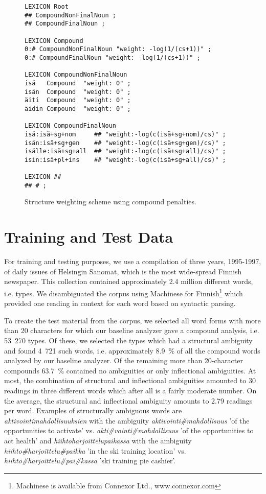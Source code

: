 \documentclass[11pt]{article}
\begin{document}
\begin{figure*}[htb!]
  \begin{small}
\begin{verbatim}
LEXICON Root
## CompoundNonFinalNoun ;
## CompoundFinalNoun ;

LEXICON Compound
0:# CompoundNonFinalNoun "weight: -log(1/(cs+1))" ;
0:# CompoundFinalNoun "weight: -log(1/(cs+1))" ;

LEXICON CompoundNonFinalNoun
isä   Compound  "weight: 0" ;
isän  Compound  "weight: 0" ;
äiti  Compound  "weight: 0" ;
äidin Compound  "weight: 0" ;

LEXICON CompoundFinalNoun
isä:isä+sg+nom     ## "weight:-log(c(isä+sg+nom)/cs)" ;
isän:isä+sg+gen    ## "weight:-log(c(isä+sg+gen)/cs)" ;
isälle:isä+sg+all  ## "weight:-log(c(isä+sg+all)/cs)" ;
isin:isä+pl+ins    ## "weight:-log(c(isä+sg+all)/cs)" ;

LEXICON ##
## # ;
\end{verbatim}
    \caption{Structure weighting scheme using compound penalties.
    }\label{fig:weighted3}
  \end{small}
\end{figure*}


\section{Training and Test Data}
\label{Sect4}

For training and testing purposes, we use a compilation of three
years, 1995-1997, of daily issues of Helsingin Sanomat, which is the
most wide-spread Finnish newspaper. This collection contained
approximately 2.4 million different words, i.e. types. We
disambiguated the corpus using Machinese for
Finnish\footnote{Machinese is available from Connexor Ltd.,
  www.connexor.com} which provided one reading in context for each
word based on syntactic parsing.

To create the test material from the corpus, we selected all word
forms with more than 20 characters for which our baseline analyzer
\cite{pirinen/2008} gave a compound analysis, i.e. 53~270 types. Of
these, we selected the types which had a structural ambiguity and
found 4~721 such words, i.e. approximately 8.9~\% of all the compound
words analyzed by our baseline analyzer. Of the remaining more than
20-character compounds 63.7~\% contained no ambiguities or only
inflectional ambiguities. At most, the combination of structural and
inflectional ambiguities amounted to 30 readings in three different
words which after all is a fairly moderate number. On the average, the
structural and inflectional ambiguity amounts to 2.79 readings per
word. Examples of structurally ambiguous words are
\emph{aktivointi\-mahdollisuuksien} with the ambiguity
\emph{aktivointi\#mahdollisuus} 'of the opportunities to activate' vs.
\emph{akti\#vointi\#mahdollisuus} 'of the opportunities to act health'
and \emph{hiihto\-harjoittelu\-paikassa} with the ambiguity
\emph{hiihto\#harjoittelu\#paikka} 'in the ski training location'
vs. \emph{hiihto\#harjoittelu\#pai\#kassa} 'ski training pie cashier'.
\end{document}
